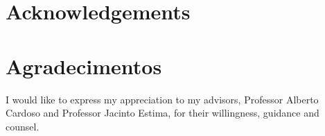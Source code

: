 \thispagestyle{plain}

{\section*{Acknowledgements}}
{\section*{Agradecimentos}}


I would like to express my appreciation to my advisors, Professor Alberto Cardoso and Professor Jacinto Estima, for their willingness, guidance and counsel. 


